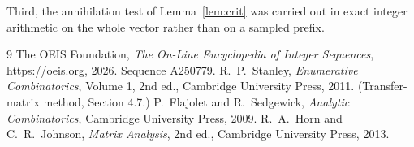 \documentclass[11pt,a4paper]{article}
\theoremstyle{plain}
\theoremstyle{definition}
\begin{document}
Third, the annihilation test of Lemma~\ref{lem:crit} was carried out in exact integer
arithmetic on the whole vector rather than on a sampled prefix.

\begin{thebibliography}{9}
 The OEIS Foundation, \emph{The On-Line Encyclopedia of Integer
Sequences}, \url{https://oeis.org}, 2026. Sequence A250779.
 R.~P.~Stanley, \emph{Enumerative Combinatorics}, Volume 1, 2nd ed.,
Cambridge University Press, 2011. (Transfer-matrix method, Section 4.7.)
 P.~Flajolet and R.~Sedgewick, \emph{Analytic Combinatorics}, Cambridge
University Press, 2009.
 R.~A.~Horn and C.~R.~Johnson, \emph{Matrix Analysis}, 2nd ed., Cambridge
University Press, 2013.
\end{thebibliography}
\end{document}
